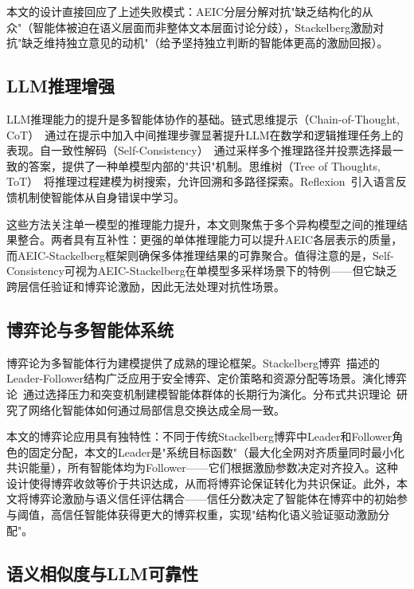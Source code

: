 \documentclass[12pt,a4paper,UTF8,fontset=fandol]{ctexart}
\begin{document}
本文的设计直接回应了上述失败模式：AEIC分层分解对抗"缺乏结构化的从众"（智能体被迫在语义层面而非整体文本层面讨论分歧），Stackelberg激励对抗"缺乏维持独立意见的动机"（给予坚持独立判断的智能体更高的激励回报）。

\subsection{LLM推理增强}

LLM推理能力的提升是多智能体协作的基础。链式思维提示（Chain-of-Thought, CoT）~\cite{wei2022chain}通过在提示中加入中间推理步骤显著提升LLM在数学和逻辑推理任务上的表现。自一致性解码（Self-Consistency）~\cite{wang2023selfconsistency}通过采样多个推理路径并投票选择最一致的答案，提供了一种单模型内部的"共识"机制。思维树（Tree of Thoughts, ToT）~\cite{yao2023tree}将推理过程建模为树搜索，允许回溯和多路径探索。Reflexion~\cite{shinn2023reflexion}引入语言反馈机制使智能体从自身错误中学习。

这些方法关注单一模型的推理能力提升，本文则聚焦于多个异构模型之间的推理结果整合。两者具有互补性：更强的单体推理能力可以提升AEIC各层表示的质量，而AEIC-Stackelberg框架则确保多体推理结果的可靠聚合。值得注意的是，Self-Consistency可视为AEIC-Stackelberg在单模型多采样场景下的特例——但它缺乏跨层信任验证和博弈论激励，因此无法处理对抗性场景。

\subsection{博弈论与多智能体系统}

博弈论为多智能体行为建模提供了成熟的理论框架。Stackelberg博弈~\cite{stackelberg2011market}描述的Leader-Follower结构广泛应用于安全博弈、定价策略和资源分配等场景。演化博弈论~\cite{han2022emergent}通过选择压力和突变机制建模智能体群体的长期行为演化。分布式共识理论~\cite{olfati2007consensus}研究了网络化智能体如何通过局部信息交换达成全局一致。

本文的博弈论应用具有独特性：不同于传统Stackelberg博弈中Leader和Follower角色的固定分配，本文的Leader是"系统目标函数"（最大化全网对齐质量同时最小化共识能量），所有智能体均为Follower——它们根据激励参数决定对齐投入。这种设计使得博弈收敛等价于共识达成，从而将博弈论保证转化为共识保证。此外，本文将博弈论激励与语义信任评估耦合——信任分数决定了智能体在博弈中的初始参与阈值，高信任智能体获得更大的博弈权重，实现"结构化语义验证驱动激励分配"。

\subsection{语义相似度与LLM可靠性}
\end{document}
